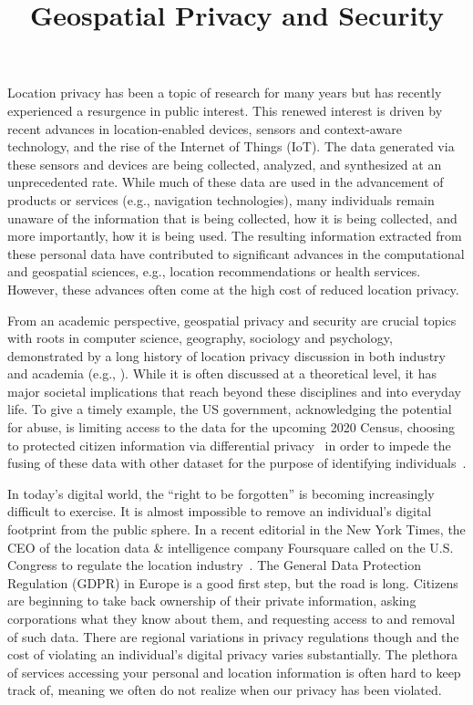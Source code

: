 \documentclass{josised}
\begin{document}

\title{Geospatial Privacy and Security}

\maketitle

	\thispagestyle{titlepage}

Location privacy has been a topic of research for many years but has recently experienced a resurgence in public interest. This renewed interest is driven by recent advances in location-enabled devices, sensors and context-aware technology, and the rise of the Internet of Things (IoT). The data generated via these sensors and devices are being collected, analyzed, and synthesized at an unprecedented rate. While much of these data are used in the advancement of products or services (e.g., navigation technologies), many individuals remain unaware of the information that is being collected, how it is being collected, and more importantly, how it is being used. The resulting information extracted from these personal data have contributed to significant advances in the computational and geospatial sciences, e.g., location recommendations or health services. However, these advances often come at the high cost of reduced location privacy.

From an academic perspective, geospatial privacy and security are crucial topics with roots in computer science, geography, sociology and psychology, demonstrated by a long history of location privacy discussion in both industry and academia (e.g., \cite{dobson2003geoslavery,duckham2005formal,krumm2009survey,armstrong2005geographic,kessler2018geoprivacy}).  While it is often discussed at a theoretical level, it has major societal implications that reach beyond these disciplines and into everyday life. To give a timely example, the US government, acknowledging the potential for abuse, is limiting access to the data for the upcoming 2020 Census, choosing to protected citizen information via differential privacy~\cite{dwork2011differential} in order to impede the fusing of these data with other dataset for the purpose of identifying individuals~\cite{census2020}.

In today’s digital world, the ``right to be forgotten'' is becoming increasingly difficult to exercise. It is almost impossible to remove an individual’s digital footprint from the public sphere. In a recent editorial in the New York Times, the CEO of the location data \& intelligence company Foursquare called on the U.S. Congress to regulate the location industry~\cite{glueck2019}. The General Data Protection Regulation (GDPR) in Europe is a good first step, but the road is long.  Citizens are beginning to take back ownership of their private information, asking corporations what they know about them, and requesting access to and removal of such data. There are regional variations in privacy regulations though and the cost of violating an individual’s digital privacy varies substantially.  The plethora of services accessing your personal and location information is often hard to keep track of, meaning we often do not realize when our privacy has been violated.
\end{document}
